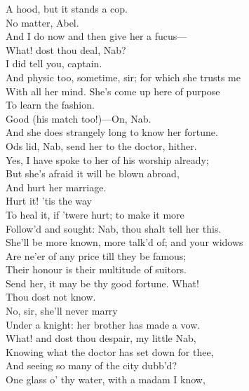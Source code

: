 \documentclass[a4paper,oneside]{memoir}
\begin{document}
\begin{drama*}
A hood, but it stands a cop.\\
\facespeaks {} No matter, Abel.\\
\druggerspeaks And I do now and then give her a fucus---\\
\facespeaks What! dost thou deal, Nab?\\
\subtlespeaks {} I did tell you, captain.\\
\druggerspeaks And physic too, sometime, sir; for which she trusts me\\
With all her mind. She's come up here of purpose\\
To learn the fashion.\\
\facespeaks {} Good (his match too!)---On, Nab.\\
\druggerspeaks And she does strangely long to know her fortune.\\
\facespeaks Ods lid, Nab, send her to the doctor, hither.\\
\druggerspeaks Yes, I have spoke to her of his worship already;\\
But she's afraid it will be blown abroad,\\
And hurt her marriage.\\
\facespeaks {} Hurt it! 'tis the way\\
To heal it, if 'twere hurt; to make it more\\
Follow'd and sought: Nab, thou shalt tell her this.\\
She'll be more known, more talk'd of; and your widows\\
Are ne'er of any price till they be famous;\\
Their honour is their multitude of suitors.\\
Send her, it may be thy good fortune. What!\\
Thou dost not know.\\
\druggerspeaks {} No, sir, she'll never marry\\
Under a knight: her brother has made a vow.\\
\facespeaks What! and dost thou despair, my little Nab,\\
Knowing what the doctor has set down for thee,\\
And seeing so many of the city dubb'd?\\
One glass o' thy water, with a madam I know,\\

\end{drama*}
\end{document}
